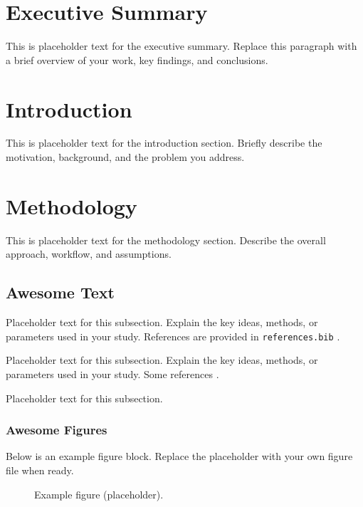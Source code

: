 \documentclass{geoheatdeliverable}
\begin{document}
\makegeoheatfrontmatter


\section{Executive Summary}
This is placeholder text for the executive summary. Replace this paragraph with a brief overview of your work, key findings, and conclusions.

\section{Introduction}
This is placeholder text for the introduction section. Briefly describe the motivation, background, and the problem you address.

\section{Methodology}
This is placeholder text for the methodology section. Describe the overall approach, workflow, and assumptions.

\subsection{Awesome Text}
Placeholder text for this subsection. Explain the key ideas, methods, or parameters used in your study. References are provided in \texttt{references.bib} \cite{Yee1966}. 

Placeholder text for this subsection. Explain the key ideas, methods, or parameters used in your study. Some references \cite{harrington2001time, CASSIDY200941}. 

Placeholder text for this subsection.

\subsubsection{Awesome Figures}
Below is an example figure block. Replace the placeholder with your own figure file when ready.

\begin{figure}[htbp]
    \centering
    \caption{Example figure (placeholder).}
    \label{fig:example_figure}
\end{figure}
\end{document}
